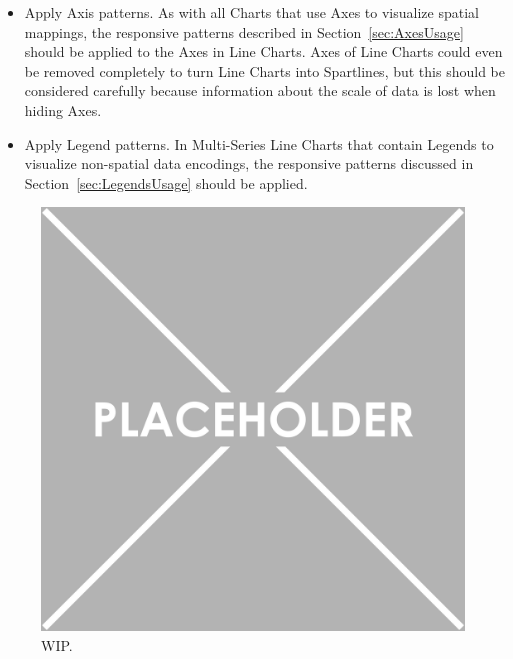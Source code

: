 \begin{itemize}
\item
Apply Axis patterns.
As with all Charts that use Axes to visualize spatial mappings, the responsive patterns described in Section~\ref{sec:AxesUsage} should be applied to the Axes in Line Charts.
Axes of Line Charts could even be removed completely to turn Line Charts into Spartlines, but this should be considered carefully because information about the scale of data is lost when hiding Axes.

\item
Apply Legend patterns.
In Multi-Series Line Charts that contain Legends to visualize non-spatial data encodings, the responsive patterns discussed in Section~\ref{sec:LegendsUsage} should be applied.

\end{itemize}


\begin{samepage}
%
    WIP
  },
]{listings/line-chart-patterns.html}
\end{samepage}

\begin{figure}[tp]
\centering
\includegraphics[keepaspectratio,width=\linewidth,height=\fullh]{images/placeholder.png}
\caption[Results of Responsive Patterns Targeting Line Charts]{
  WIP.
}
\label{fig:LineChartPatterns}
\end{figure}

